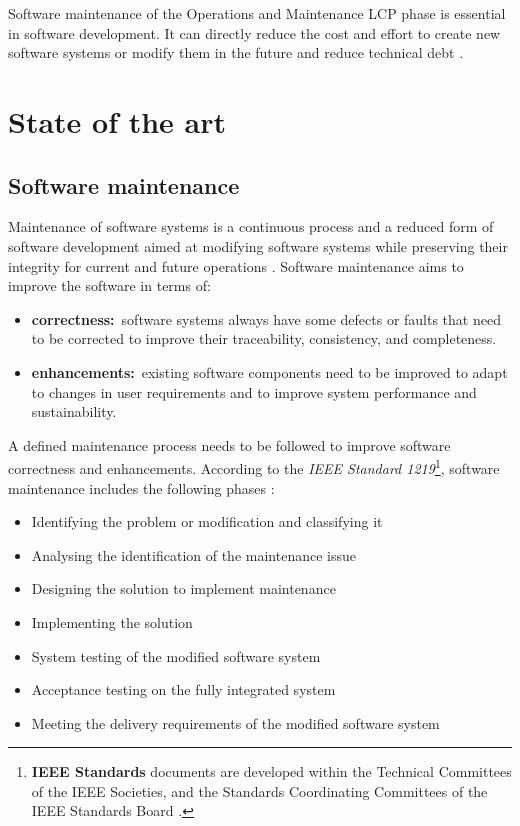Software maintenance of the Operations and Maintenance LCP phase is essential in software development. It can directly reduce the cost and effort to create new software systems or modify them in the future and reduce technical debt \cite{Thamburaj2017, DeLeon-Sigg2020}.

\clearpage

\section{State of the art}

\subsection{Software maintenance}\label{sec:ch1_softwareMaintenanceIntro}{}
Maintenance of software systems is a continuous process and a reduced form of software development aimed at modifying software systems while preserving their integrity for current and future operations \cite{Sneed2004, Ackermann2009, Port2017}. Software maintenance aims to improve the software in terms of:

\begin{itemize}
	\item \textbf{correctness:}~software systems always have some defects or faults that need to be corrected to improve their traceability, consistency, and completeness.
	\item \textbf{enhancements:}\RaggedRight~existing software components need to be improved to adapt to changes in user requirements and to improve system performance and sustainability.
\end{itemize}

A defined maintenance process needs to be followed to improve software correctness and enhancements. According to the \textit{IEEE Standard 1219}\footnote{\textbf{IEEE Standards} documents are developed within the Technical Committees of the IEEE Societies, and the Standards Coordinating Committees of the IEEE Standards Board \cite{Mamone1994}.}, software maintenance includes the following phases \cite{Mamone1994, Hasan2012, Stojanov2017}:

\begin{itemize}
	\item Identifying the problem or modification and classifying it
	\item Analysing the identification of the maintenance issue
	\item Designing the solution to implement maintenance
	\item Implementing the solution
	\item System testing of the modified software system
	\item Acceptance testing on the fully integrated system
	\item Meeting the delivery requirements of the modified software system
\end{itemize}

